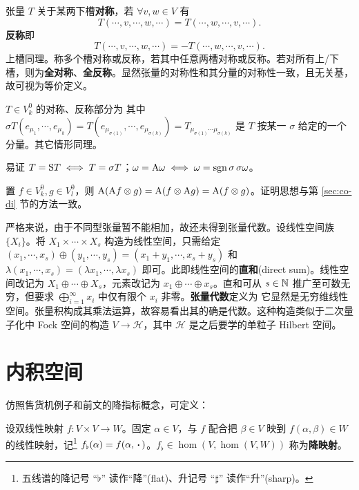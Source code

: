 \begin{definition}
    张量 $T$ 关于某两下槽\textbf{对称}，若 $\forall v,w\in V$ 有
    \[
    T(\cdots,v,\cdots,w,\cdots)=T(\cdots,w,\cdots,v,\cdots).
    \]
    \textbf{反称}即
    \[
    T(\cdots,v,\cdots,w,\cdots)=-T(\cdots,w,\cdots,v,\cdots).
    \]
    上槽同理。称多个槽对称或反称，若其中任意两槽对称或反称。若对所有上/下槽，则为\textbf{全对称}、\textbf{全反称}。显然张量的对称性和其分量的对称性一致，且无关基，故可视为等价定义。

    $T\in V^0_k$ 的对称、反称部分为
其中 $\sigma T(e_{\mu_1},\cdots,e_{\mu_k})=T(e_{\mu_{\sigma(1)}},\cdots,e_{\mu_{\sigma(k)}})=T_{\mu_{\sigma(1)}\cdots\mu_{\sigma(k)}}$ 是 $T$ 按某一 $\sigma$ 给定的一个分量。其它情形同理。
\end{definition}

\begin{theorem}
    易证 $T=\S T\iff T=\sigma T$；$\omega=\A\omega\iff\omega=\sgn\sigma\,\sigma\omega$。
\end{theorem}

\begin{theorem}
    置 $f\in V^0_k,g\in V^0_l$，则 $\A(\A f\otimes g)=\A(f\otimes\A g)=\A(f\otimes g)$。证明思想与第 \ref{sec:co-di} 节的方法一致。
\end{theorem}

严格来说，由于不同型张量暂不能相加，故还未得到张量代数。设线性空间族 $\{X_i\}$。将 $X_1\times\cdots\times X_s$ 构造为线性空间，只需给定 $(x_1,\cdots,x_s)\oplus(y_1,\cdots,y_s)=(x_1+y_1,\cdots,x_s+y_s)$ 和 $\lambda(x_1,\cdots,x_s)=(\lambda x_1,\cdots,\lambda x_s)$ 即可。此即线性空间的\textbf{直和}(direct sum)。线性空间改记为 $X_1\oplus\cdots\oplus X_s$，元素改记为 $x_1\oplus\cdots\oplus x_s$。直和可从 $s\in\N$ 推广至可数无穷，但要求 $\bigoplus_{i=1}^\infty x_i$ 中仅有限个 $x_i$ 非零。\textbf{张量代数}定义为
它显然是无穷维线性空间。张量积构成其乘法运算，故容易看出其的确是代数。这种构造类似于二次量子化中 Fock 空间的构造 $V\to\mathscr H$，其中 $\mathscr H$ 是之后要学的单粒子 Hilbert 空间。

\section{内积空间}

仿照售货机例子和前文的降指标概念，可定义：

\begin{definition}
    设双线性映射 $f:V\times V\to W$。固定 $\alpha\in V$，与 $f$ 配合把 $\beta\in V$ 映到 $f(\alpha,\beta)\in W$ 的线性映射，记\footnote{五线谱的降记号 “$\flat$” 读作“降”(flat)、升记号 “$\sharp$” 读作“升”(sharp)。} $f_\flat(\alpha)=f(\alpha,\oo)$。$f_\flat\in\hom(V,\hom(V,W))$ 称为\textbf{降映射}。
\end{definition}



